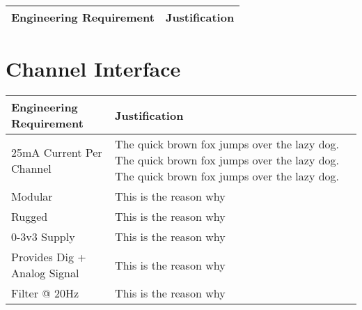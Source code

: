 \documentclass{article}
\begin{document}
\begin{tabular}{|p{3in}|p{3in}|}
\hline
Engineering Requirement & Justification \\
\hline
\end{tabular}


\section{Channel Interface}

\begin{tabular}{|p{3in}|p{3in}|}
\hline
Engineering Requirement & Justification \\
\hline

25mA Current Per Channel & The quick brown fox jumps over the lazy
dog. The quick brown fox jumps over the lazy dog. The quick brown fox
jumps over the lazy dog.  \\

\hline
Modular & This is the reason why \\
\hline
Rugged & This is the reason why \\
\hline
0-3v3 Supply & This is the reason why \\
\hline
Provides Dig + Analog Signal & This is the reason why \\
\hline
Filter @ 20Hz & This is the reason why \\
\hline

\end{tabular}
\end{document}
